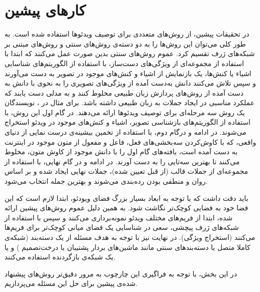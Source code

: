 \section{کارهای پیشین}\label{review}
در تحقیقات پیشین، از روش‌های متعددی برای توصیف ویدئو‌ها استفاده شده است. به طور کلی می‌توان این‌ روش‌ها را به دو دسته‌ی روش‌های سنتی و روش‌های مبتنی بر شبکه‌های ژرف تقسیم کرد. عموم روش‌های سنتی بدین صورت عمل می‌کنند که ابتدا با استفاده از مجموعه‌ای از ویژگی‌های دست‌ساز، با استفاده از الگوریتم‌های شناسایی اشیاء یا کنش‌ها، یک باز‌نمایش از اشیاء و کنش‌های موجود در تصویر به دست می‌آورند و سپس تلاش می‌کنند دانش به‌دست آمده از ویژگی‌های تصویری را به نحوی با دانش به دست آمده از روش‌های پردازش زبان طبیعی مخلوط کنند و به مدلی دست یابند که عملکرد مناسبی در ایجاد جملات به زبان طبیعی داشته باشد. برای مثال در \cite{Krishnamoorthy2013}، نویسندگان یک روش سه مرحله‌ای برای توصیف ویدئو‌ها ارائه می‌دهند. در گام اول این روش، با استفاده از الگوریتم‌های بازشناسی تصویر، اشیاء و کنش‌های موجود در ویدئو استخراج می‌شوند. در ادامه و درگام دوم، با استفاده از تخمین بیشینه‌ی درست نمایی 
از دنیای واقعی، که با کاوش‌کردن سه‌بخشی‌های فعل، فاعل و مفعول از متون موجود در اینترنت به دست آمده است، یافته‌های گام اول را با دانش موجود از کاوش متون، مخلوط می‌کنند تا بهترین سه‌تایی را به دست آورند. در ادامه و در گام نهایی، با استفاده از مجموعه‌ای از جملات قالب (از قبل تعیین شده)، جملات نهایی ایجاد شده و بر اساس روان‌ و منطقی بودن رده‌بندی می‌شوند و بهترین جمله انتخاب می‌شود.

باید دقت داشت که با توجه به ابعاد بسیار بزرگ فضای ویودئو، ابتدا لازم است که این فضا خود به فضایی کوچک‌تر نگاشت شود. به همین دلیل عموم‌ روش‌های پیشین ارائه شده، ابتدا از فریم‌های مختلف ویدئو نمونه‌برداری می‌کنند و سپس با استفاده از شبکه‌‌های ژرف پیچشی، سعی در شناسایی یک فضای میانی کوچک‌تر برای فریم‌ها می‌کنند (استخراج ویژگی). در نهایت نیز با توجه به هدف مسئله از یک دسته‌بند (شبکه‌ی کاملا متصل  یا دسته‌بند‌های سنتی مانند ماشین‌های بردار پشتیبان  یا درخت‌تصمیم ) و یا یک شبکه‌‌ی بازگردنده  استفاده می‌کنند.

در این بخش، با توجه به فراگیری این چارچوب به مرور دقیق‌تر روش‌های پیشنهاد شده‌ی پیشین برای حل این مسئله می‌پردازیم. 
  
